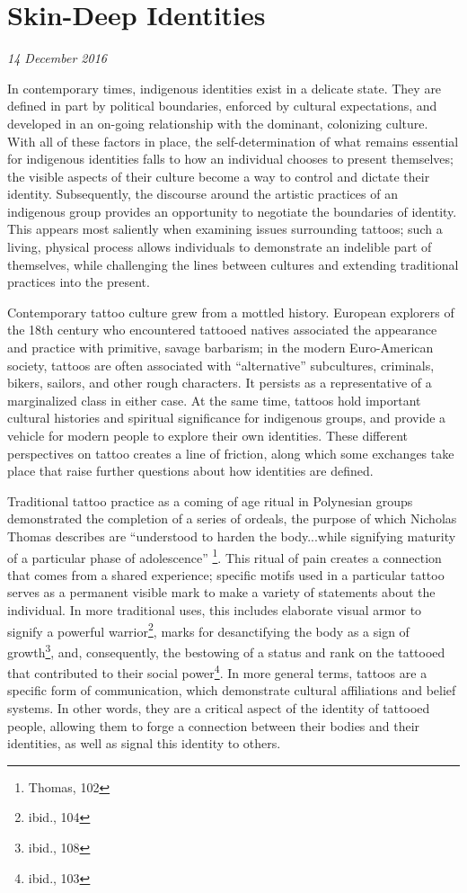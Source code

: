 \section{Skin-Deep Identities}

\textit{14 December 2016}

In contemporary times, indigenous identities exist in a delicate state.  They
are defined in part by political boundaries, enforced by cultural expectations,
and developed in an on-going relationship with the dominant, colonizing culture.
With all of these factors in place, the self-determination of what remains
essential for indigenous identities falls to how an individual chooses to
present themselves; the visible aspects of their culture become a way to control
and dictate their identity. Subsequently, the discourse around the artistic
practices of an indigenous group provides an opportunity to negotiate the
boundaries of identity. This appears most saliently when examining issues
surrounding tattoos; such a living, physical process allows individuals to
demonstrate an indelible part of themselves, while challenging the lines between
cultures and extending traditional practices into the present.

Contemporary tattoo culture grew from a mottled history. European explorers of
the 18th century who encountered tattooed natives associated the appearance and
practice with primitive, savage barbarism; in the modern Euro-American society,
tattoos are often associated with ``alternative'' subcultures, criminals,
bikers, sailors, and other rough characters. It persists as a representative of
a marginalized class in either case. At the same time, tattoos hold important
cultural histories and spiritual significance for indigenous groups, and provide
a vehicle for modern people to explore their own identities. These different
perspectives on tattoo creates a line of friction, along which some exchanges
take place that raise further questions about how identities are defined.

Traditional tattoo practice as a coming of age ritual in Polynesian groups
demonstrated the completion of a series of ordeals, the purpose of which
Nicholas Thomas describes are ``understood to harden the body...while signifying
maturity of a particular phase of adolescence'' \footnote{Thomas, 102}. This
ritual of pain creates a connection that comes from a shared experience;
specific motifs used in a particular tattoo serves as a permanent visible mark
to make a variety of statements about the individual. In more traditional uses,
this includes elaborate visual armor to signify a powerful
warrior\footnote{ibid., 104}, marks for desanctifying the body as a sign of
growth\footnote{ibid., 108}, and, consequently, the bestowing of a status and
rank on the tattooed that contributed to their social power\footnote{ibid.,
103}. In more general terms, tattoos are a specific form of communication, which
demonstrate cultural affiliations and belief systems. In other words, they are a
critical aspect of the identity of tattooed people, allowing them to forge a
connection between their bodies and their identities, as well as signal this
identity to others.

